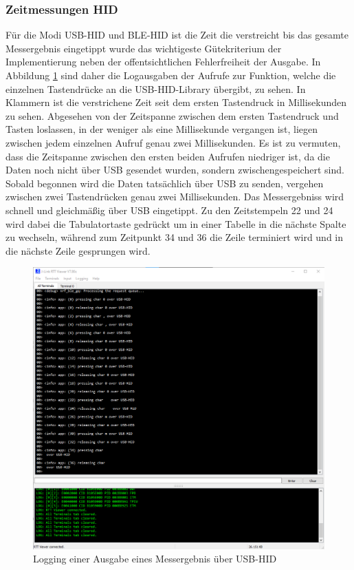 \subsubsection{Zeitmessungen HID}
Für die Modi USB-HID und BLE-HID ist die Zeit die verstreicht bis das gesamte Messergebnis eingetippt wurde das wichtigeste Gütekriterium der Implementierung neben der offentsichtlichen Fehlerfreiheit der Ausgabe. In Abbildung \ref{fig:LoggingAusgabeMessergebnisUSBHID} sind daher die Logausgaben der Aufrufe zur Funktion, welche die einzelnen Tastendrücke an die USB-HID-Library übergibt, zu sehen. In Klammern ist die verstrichene Zeit seit dem ersten Tastendruck in Millisekunden zu sehen. Abgesehen von der Zeitspanne zwischen dem ersten Tastendruck und Tasten loslassen, in der weniger als eine Millisekunde vergangen ist, liegen zwischen jedem einzelnen Aufruf genau zwei Millisekunden. Es ist zu vermuten, dass die Zeitspanne zwischen den ersten beiden Aufrufen niedriger ist, da die Daten noch nicht über USB gesendet wurden, sondern zwischengespeichert sind. Sobald begonnen wird die Daten tatsächlich über USB zu senden, vergehen zwischen zwei Tastendrücken genau zwei Millisekunden. Das Messergebniss wird schnell und gleichmäßig über USB eingetippt. Zu den Zeitstempeln 22 und 24 wird dabei die Tabulatortaste gedrückt um in einer Tabelle in die nächste Spalte zu wechseln, während zum Zeitpunkt 34 und 36 die Zeile terminiert wird und in die nächste Zeile gesprungen wird.
\begin{figure}[H] 
	\centering
	\includegraphics[width=\textwidth]{figures/USBHID.png}
	\caption{Logging einer Ausgabe eines Messergebnis über USB-HID}
	\label{fig:LoggingAusgabeMessergebnisUSBHID}
\end{figure}

